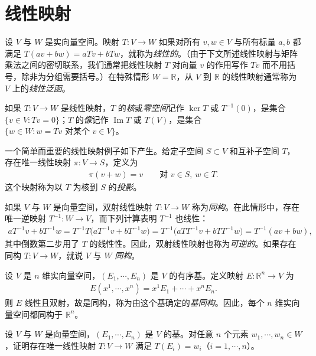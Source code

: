 \documentclass[../../main.tex]{subfiles}
\begin{document}
\section{线性映射}\label{section:appB-linear-maps}

设 $V$ 与 $W$ 是实向量空间。映射 $T:V\to W$ 如果对所有 $v,w\in V$ 与所有标量 $a,b$ 都满足 $T(av+bw)=aTv+bTw$，就称为\emph{线性的}。（由于下文所述线性映射与矩阵乘法之间的密切联系，我们通常把线性映射 $T$ 对向量 $v$ 的作用写作 $Tv$ 而不用括号，除非为分组需要括号。）在特殊情形 $W=\mathbb R$，从 $V$ 到 $\mathbb R$ 的线性映射通常称为 $V$ 上的\emph{线性泛函}。

如果 $T:V\to W$ 是线性映射，$T$ 的\emph{核}或\emph{零空间}记作 $\ker T$ 或 $T^{-1}(0)$，是集合 $\{v\in V:Tv=0\}$；$T$ 的\emph{像}记作 $\operatorname{Im}T$ 或 $T(V)$，是集合 $\{w\in W:w=Tv\text{ 对某个 }v\in V\}$。

一个简单而重要的线性映射例子如下产生。给定子空间 $S\subset V$ 和互补子空间 $T$，存在唯一线性映射 $\pi:V\to S$，定义为
\begin{align*}
\pi(v+w)=v\qquad\text{对 }v\in S,\ w\in T.
\end{align*}
这个映射称为以 $T$ 为核到 $S$ 的\emph{投影}。

如果 $V$ 与 $W$ 是向量空间，双射线性映射 $T:V\to W$ 称为\emph{同构}。在此情形中，存在唯一逆映射 $T^{-1}:W\to V$，而下列计算表明 $T^{-1}$ 也线性：
\begin{align*}
aT^{-1}v+bT^{-1}w=T^{-1}T\big(aT^{-1}v+bT^{-1}w\big)
=T^{-1}\big(aTT^{-1}v+bTT^{-1}w\big)
=T^{-1}(av+bw),
\end{align*}
其中倒数第二步用了 $T$ 的线性性。因此，双射线性映射也称为\emph{可逆的}。如果存在同构 $T:V\to W$，就说 $V$ 与 $W$ \emph{同构}。

\begin{example}\label{example:appB-basis-isomorphism}
设 $V$ 是 $n$ 维实向量空间，$(E_1,\cdots ,E_n)$ 是 $V$ 的有序基。定义映射 $E:\mathbb R^n\to V$ 为
\begin{align*}
E(x^1,\cdots ,x^n)=x^1E_1+\cdots+x^nE_n.
\end{align*}
则 $E$ 线性且双射，故是同构，称为由这个基确定的\emph{基同构}。因此，每个 $n$ 维实向量空间都同构于 $\mathbb R^n$。
\end{example}

\begin{exercise}\label{exercise:appB-B-13}
设 $V$ 与 $W$ 是向量空间，$(E_1,\cdots ,E_n)$ 是 $V$ 的基。对任意 $n$ 个元素 $w_1,\cdots ,w_n\in W$，证明存在唯一线性映射 $T:V\to W$ 满足 $T(E_i)=w_i$（$i=1,\cdots ,n$）。
\end{exercise}
\end{document}
